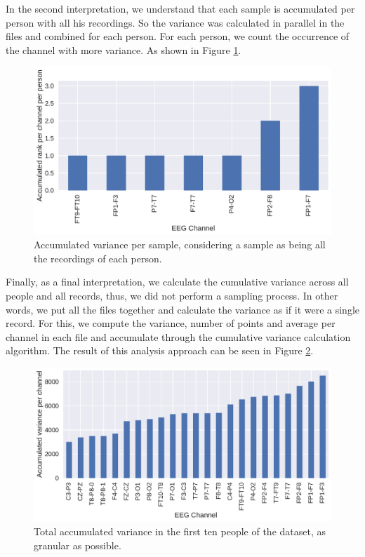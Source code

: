 In the second interpretation, we understand that each sample is accumulated per person with all his recordings. So the variance was calculated in parallel in the files and combined for each person. For each person, we count the occurrence of the channel with more variance. As shown in Figure \ref{fig:variance_per_person}.


\begin{figure}[!ht]
  \centering
  \includegraphics[width=\linewidth]{figure/variance_per_person.pdf}
  \caption{Accumulated variance per sample, considering a sample as being all the recordings of each person.}
  \label{fig:variance_per_person}
\end{figure}



Finally, as a final interpretation, we calculate the cumulative variance across all people and all records, thus, we did not perform a sampling process. In other words, we put all the files together and calculate the variance as if it were a single record. For this, we compute the variance, number of points and average per channel in each file and accumulate through the cumulative variance calculation algorithm. The result of this analysis approach can be seen in Figure \ref{fig:variance_all_files}.


\begin{figure}[!ht]
  \centering
  \includegraphics[width=\linewidth]{figure/variance_all.pdf}
  \caption{Total accumulated variance in the first ten people of the dataset, as granular as possible.}
\label{fig:variance_all_files}
\end{figure}


